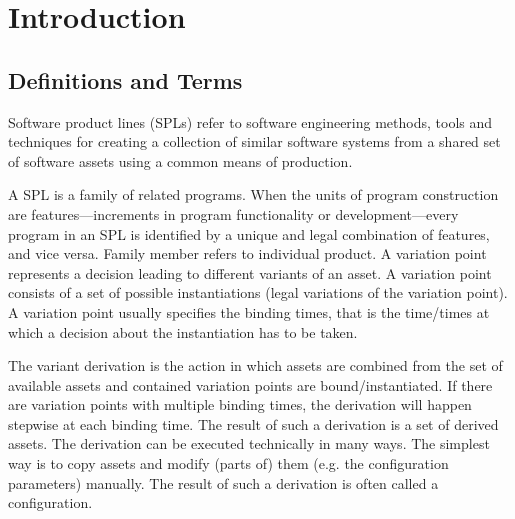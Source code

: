 \documentclass[sigconf]{acmart}
\begin{document}
%
%

%

%
\maketitle

\section{Introduction}
\subsection{Definitions and Terms}

Software product lines (SPLs) refer to software engineering methods, tools and
techniques for creating a collection of similar software systems from a shared set of
software assets using a common means of production.

A SPL is a family of related programs. When the units of program construction are features—increments in
program functionality or development—every program in an SPL is identified by a unique and legal
combination of features, and vice versa. Family member refers to individual product. A variation point
represents a decision leading to different variants of an asset. A variation point consists of a set of
possible instantiations (legal variations of the variation point). A variation point usually specifies the
binding times, that is the time/times at which a decision about the instantiation has to be taken.

The variant derivation is the action in which assets are combined from the set of available assets and
contained variation points are bound/instantiated. If there are variation points with multiple binding times,
the derivation will happen stepwise at each binding time. The result of such a derivation is a set of derived
assets. The derivation can be executed technically in many ways. The simplest way is to copy assets and modify
(parts of) them (e.g. the configuration parameters) manually. The result of such a derivation is often called a
configuration.
\end{document}
